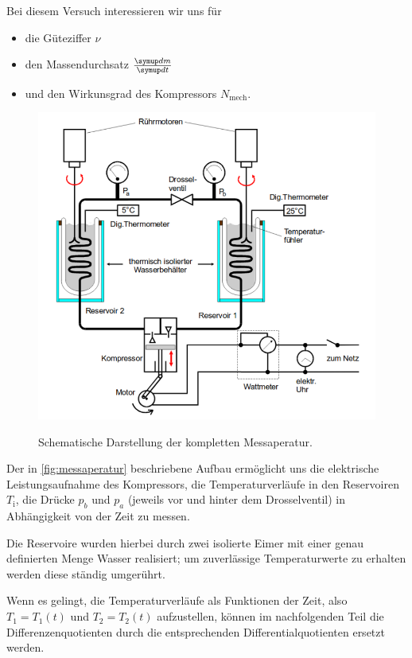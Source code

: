 Bei diesem Versuch interessieren wir uns f\"ur
\begin{itemize}
	\item die G\"uteziffer $\nu$
	\item den Massendurchsatz $\frac{\symup d m}{\symup d t}$
	\item und den Wirkunsgrad des Kompressors  $N_\text{mech}$.
\end{itemize}

\begin{figure}[H]
	\centering
	\includegraphics{content/messaperatur.pdf}
	\caption{Schematische Darstellung der kompletten Messaperatur.}
	\cite{anleitung}
	\label{fig:messaperatur}
\end{figure}

Der in \autoref{fig:messaperatur} beschriebene Aufbau erm\"oglicht uns 
die elektrische Leistungsaufnahme des Kompressors,
die Temperaturverl\"aufe in den Reservoiren $T_\text{i}$, 
die Dr\"ucke $p_b$ und $p_a$ (jeweils vor und hinter dem Drosselventil)
in Abh\"angigkeit von der Zeit zu messen.

Die Reservoire wurden hierbei durch zwei isolierte Eimer mit einer genau
definierten Menge Wasser realisiert; um zuverl\"assige Temperaturwerte zu erhalten
werden diese st\"andig umger\"uhrt.

Wenn es gelingt, die Temperaturverl\"aufe als Funktionen der Zeit, also $T_1 = T_1(t)$ und
$T_2 = T_2(t)$ aufzustellen, k\"onnen im nachfolgenden Teil die Differenzenquotienten durch
die entsprechenden Differentialquotienten ersetzt werden.

